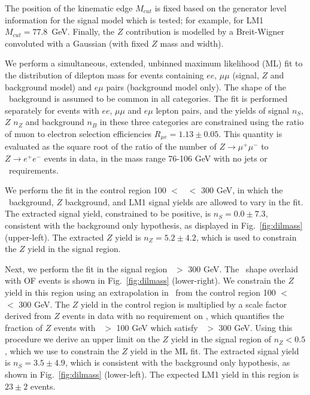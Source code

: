 The position of the kinematic edge $M_{cut}$ is fixed based on the generator level
information for the signal model which is tested; for example, for LM1 
$M_{cut} = 77.8$~GeV. Finally, the $Z$ contribution is modelled by a Breit-Wigner 
convoluted with a Gaussian (with fixed $Z$ mass and width). 

We perform a simultaneous, extended, unbinned maximum 
likelihood (ML) fit to the distribution of dilepton mass for events containing $ee$, $\mu\mu$ 
(signal, $Z$ and background model)
and $e\mu$ pairs (background model only). 
The shape of the \ttbar\ background is assumed to be common in all categories.
The fit is performed separately for events with $ee$, $\mu\mu$ and $e\mu$ lepton pairs,
and the yields of signal $n_S$, $Z$ $n_Z$ and background $n_B$ 
in these three categories are constrained using the ratio of muon to electron selection efficiencies
$R_{\mu e} = 1.13 \pm 0.05$. This quantity is evaluated as the square root of the ratio of the number of 
$Z \to \mu^+\mu^-$ to $Z \to e^+e^-$ events in data, in the mass range 76-106 GeV with no jets or 
\met\ requirements. 

We perform the fit in the control region 100 $<$ \Ht\ $<$ 300 GeV, in
which the \ttbar\ background, $Z$ background, and LM1 signal yields are allowed to vary in the fit. 
The extracted signal yield, constrained to be positive, is $n_S = 0.0 \pm 7.3$, 
consistent with the background only 
hypothesis, as displayed in Fig.~\ref{fig:dilmass} (upper-left). 
The extracted $Z$ yield is $n_Z = 5.2 \pm 4.2$, which is 
used to constrain the $Z$ yield in the signal region. 

Next, we perform the fit in the signal region \Ht\ $>$ 300 GeV. The \ttbar\ shape
overlaid with OF events is shown in Fig.~\ref{fig:dilmass} (lower-right). We
constrain the $Z$ yield in this region using an extrapolation in \Ht\ from the 
control region 100 $<$ \Ht\ $<$ 300 GeV. The $Z$ yield in the control region is
multiplied by a scale factor derived from $Z$ events in data with no requirement
on \MET, which quantifies the fraction of $Z$ events with \Ht\ $>$ 100 GeV which 
satisfy \Ht\ $>$ 300 GeV. Using this procedure we derive an upper limit on the
$Z$ yield in the signal region of $n_Z < 0.5$, which we use to constrain the
$Z$ yield in the ML fit. The extracted signal yield is $n_S = 3.5 \pm 4.9$,
which is consistent with the background only hypothesis,
as shown in Fig.~\ref{fig:dilmass} (lower-left). The expected LM1
yield in this region is $23\pm2 $ events.
